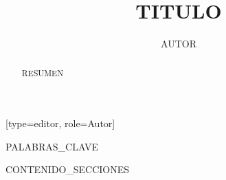 \documentclass[letterpaper,fleqn]{ciep-dc}
\begin{document}
\let\WriteBookmarks\relax
\def\floatpagepagefraction{1}
\def\textpagefraction{.001}


\title[mode=title]{{{TITULO}}}

\author[1]{{{AUTOR}}}[type=editor, role=Autor]
\fnmark[1]


\address[1]{{{INSTITUCION}}}

\begin{abstract}
{{RESUMEN}}
\end{abstract}

\begin{keywords}
{{PALABRAS_CLAVE}}
\end{keywords}

\maketitle

{{CONTENIDO_SECCIONES}}

\renewcommand{\refname}{Bibliografía}


\end{document}
